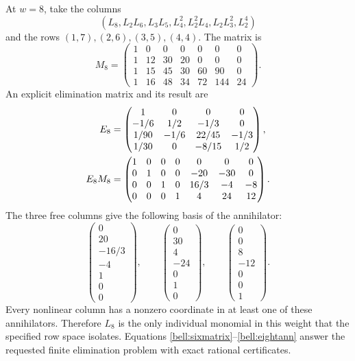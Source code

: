 \documentclass[11pt,a4paper]{article}
\numberwithin{equation}{section}
\theoremstyle{definition}
\theoremstyle{remark}
\begin{document}
At $w=8$, take the columns
\[
 (L_8,L_2L_6,L_3L_5,L_4^2,L_2^2L_4,L_2L_3^2,L_2^4)
\]
and the rows $(1,7),(2,6),(3,5),(4,4)$. The matrix is
\begin{equation}
 M_8=\begin{pmatrix}
 1&0&0&0&0&0&0\\
 1&12&30&20&0&0&0\\
 1&15&45&30&60&90&0\\
 1&16&48&34&72&144&24
 \end{pmatrix}.
 \label{bell:eightmatrix}
\end{equation}
An explicit elimination matrix and its result are
\begin{align}
 E_8&=\begin{pmatrix}
 1&0&0&0\\-1/6&1/2&-1/3&0\\
 1/90&-1/6&22/45&-1/3\\1/30&0&-8/15&1/2
 \end{pmatrix},\notag\\
 E_8M_8&=\begin{pmatrix}
 1&0&0&0&0&0&0\\
 0&1&0&0&-20&-30&0\\
 0&0&1&0&16/3&-4&-8\\
 0&0&0&1&4&24&12
 \end{pmatrix}.
 \label{bell:eightrref}
\end{align}
The three free columns give the following basis of the annihilator:
\begin{equation}
 \begin{pmatrix}0\\20\\-16/3\\-4\\1\\0\\0\end{pmatrix},\qquad
 \begin{pmatrix}0\\30\\4\\-24\\0\\1\\0\end{pmatrix},\qquad
 \begin{pmatrix}0\\0\\8\\-12\\0\\0\\1\end{pmatrix}.
 \label{bell:eightann}
\end{equation}
Every nonlinear column has a nonzero coordinate in at least one of
these annihilators. Therefore $L_8$ is the only individual monomial
in this weight that the specified row space isolates. Equations
\eqref{bell:sixmatrix}--\eqref{bell:eightann} answer the requested finite
elimination problem with exact rational certificates.
\end{document}
